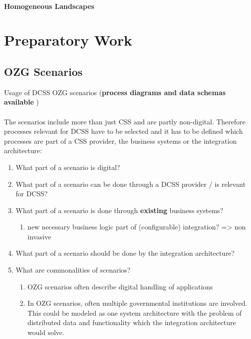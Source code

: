 \documentclass[
     12pt,         %
     a4paper,      %
     BCOR10mm,     %
     DIV14,        %
aragraph skip instad of paragraph indent
     ]{scrreprt}
\begin{document}
\subsubsection{Homogeneous Landscapes}


\chapter{Preparatory Work}

\section{OZG Scenarios}


Usage of DCSS OZG scenarios (\textbf{process diagrams and data schemas available}
\cite{ozgScenarios})
\\\\
The scenarios include more than just CSS and are partly non-digital. Therefore processes relevant for DCSS have to be selected
and it has to be defined which processes are part of a CSS provider, the business systems or the integration architecture:

\begin{enumerate}
     \item What part of a scenario is digital?
     \item What part of a scenario can be done through a DCSS provider / is relevant for DCSS?
     \item What part of a scenario is done through \textbf{existing} business systems?
           \begin{enumerate}
                \item new necessary business logic part of (configurable) integration? => non invasive
           \end{enumerate}
     \item What part of a scenario should be done by the integration architecture?
     \item What are commonalities of scenarios?
           \begin{enumerate}
                \item OZG scenarios often describe digital handling of applications
                \item In OZG scenarios, often multiple governmental institutions are involved. This could be modeled as one system architecture with the problem of distributed
                      data and functionality which the integration architecture would solve.
           \end{enumerate}
\end{enumerate}
\end{document}
